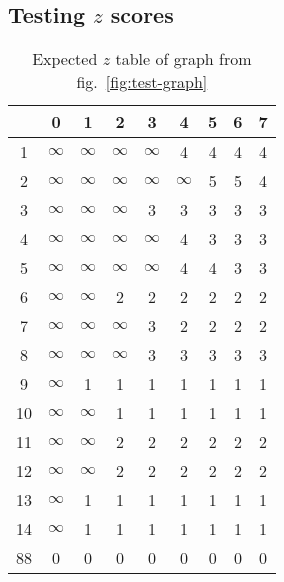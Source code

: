 \documentclass[12pt]{article}
\begin{document}
\subsection{Testing \texorpdfstring{$z$}{\textit{z}} scores}

\begin{table}[h]\centering
    \scriptsize
    \begin{tabular}{|c|cccccccc|}
        \hline
           & 0        & 1        & 2        & 3        & 4        & 5 & 6 & 7 \\ \hline
        1  & $\infty$ & $\infty$ & $\infty$ & $\infty$ & 4        & 4 & 4 & 4 \\
        2  & $\infty$ & $\infty$ & $\infty$ & $\infty$ & $\infty$ & 5 & 5 & 4 \\
        3  & $\infty$ & $\infty$ & $\infty$ & 3        & 3        & 3 & 3 & 3 \\
        4  & $\infty$ & $\infty$ & $\infty$ & $\infty$ & 4        & 3 & 3 & 3 \\
        5  & $\infty$ & $\infty$ & $\infty$ & $\infty$ & 4        & 4 & 3 & 3 \\
        6  & $\infty$ & $\infty$ & 2        & 2        & 2        & 2 & 2 & 2 \\
        7  & $\infty$ & $\infty$ & $\infty$ & 3        & 2        & 2 & 2 & 2 \\
        8  & $\infty$ & $\infty$ & $\infty$ & 3        & 3        & 3 & 3 & 3 \\
        9  & $\infty$ & 1        & 1        & 1        & 1        & 1 & 1 & 1 \\
        10 & $\infty$ & $\infty$ & 1        & 1        & 1        & 1 & 1 & 1 \\
        11 & $\infty$ & $\infty$ & 2        & 2        & 2        & 2 & 2 & 2 \\
        12 & $\infty$ & $\infty$ & 2        & 2        & 2        & 2 & 2 & 2 \\
        13 & $\infty$ & 1        & 1        & 1        & 1        & 1 & 1 & 1 \\
        14 & $\infty$ & 1        & 1        & 1        & 1        & 1 & 1 & 1 \\
        88 & 0        & 0        & 0        & 0        & 0        & 0 & 0 & 0 \\
        \hline
    \end{tabular}
    \caption{Expected $z$ table of graph from fig.~\ref*{fig:test-graph}}
    \label{tab:test-z-score-expected}
\end{table}
\end{document}
